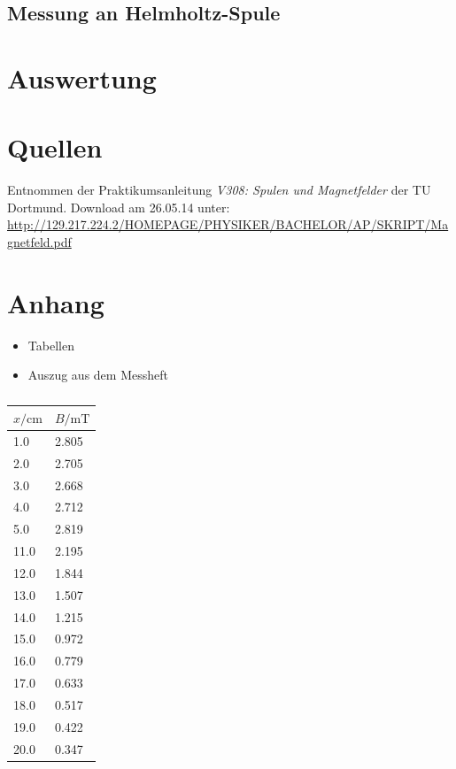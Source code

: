 \documentclass[11pt,ngerman,a4paper]{article}
\begin{document}
\subsection{Messung an Helmholtz-Spule}


\section{Auswertung}

\section{Quellen}
\begin{enumerate}[{[}1{]}]
\item Entnommen der Praktikumsanleitung \textit{V308: Spulen und Magnetfelder} der TU Dortmund. Download am 26.05.14 unter:\\
 \url{http://129.217.224.2/HOMEPAGE/PHYSIKER/BACHELOR/AP/SKRIPT/Magnetfeld.pdf}
\end{enumerate}

\section{Anhang}
\begin{itemize}
\item Tabellen
\item Auszug aus dem Messheft
\end{itemize}

\begin{table}
\centering
\begin{tabular}{ll}
\toprule
{$x / \si{\centi\meter}$} &{ $B/\si{\milli\tesla}$ }\\
\midrule
1.0 & 2.805\\
2.0 & 2.705\\
3.0 & 2.668\\
4.0 & 2.712\\
5.0 & 2.819\\
11.0 & 2.195\\
12.0 & 1.844\\
13.0 & 1.507\\
14.0 & 1.215\\
15.0 & 0.972\\
16.0 & 0.779\\
17.0 & 0.633\\
18.0 & 0.517\\
19.0 & 0.422\\
20.0 & 0.347\\
\bottomrule
\end{tabular}
\label{}
\caption{}
\end{table}
\end{document}
